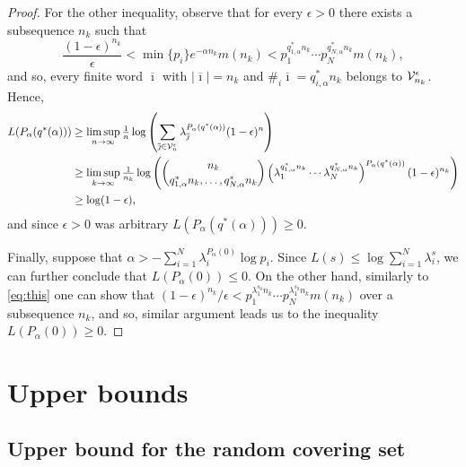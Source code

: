\documentclass[12pt,]{article}
\theoremstyle{definition}
\theoremstyle{remark}
\newcommand{\cV}{{\cal V}}
\newcommand{\0}{\mathbf{0}}
\newcommand{\bi}{{\overline {\imath}}}
\newcommand{\bj}{{\overline  {\jmath}}}
\begin{document}
\begin{proof}
  For the other inequality, observe that for every $\epsilon>0$ there exists a subsequence $n_k$ such that
  \begin{equation}\label{eq:this}
    \frac{(1-\epsilon)^{n_k}}{\epsilon}<\min\{p_i\}e^{-\alpha n_k}m(n_k)<p_1^{q_{1,\alpha}^*n_k}\cdots p_N^{q_{N,\alpha}^*n_k}m(n_k),
  \end{equation}
  and so, every finite word $\bi$ with $|\bi|=n_k$ and $\#_i\bi=q_{i,\alpha}^*n_k$ belongs to
  $\cV_{n_k}^\epsilon$. Hence,
  \[
    \begin{split}
      L(P_\alpha(q^*(\alpha)))&\geq\limsup_{n\to \infty} \tfrac 1n \log\left( \sum_{\bj\in \cV_n^\epsilon}\lambda_{\bj}^{P_\alpha(q^*(\alpha))}(1-\epsilon)^n\right)\\
			      &\geq\limsup_{k\to \infty} \tfrac{1}{n_k} \log\left( \binom{n_k}{q_{1,\alpha}^*n_k,\ldots,q_{N,\alpha}^*n_k}\left(\lambda_{1}^{q_{1,\alpha}^*n_k}\cdots\lambda_{N}^{q_{N,\alpha}^*n_k}\right)^{P_\alpha(q^*(\alpha))}(1-\epsilon)^{n_k}\right)\\
			      &\geq\log(1-\epsilon),
    \end{split}
  \]
  and since $\epsilon>0$ was arbitrary $L(P_\alpha(q^*(\alpha)))\geq0$.

  Finally, suppose that $\alpha>-\sum_{i=1}^N\lambda_i^{P_\alpha(0)}\log p_i$. Since
  $L(s)\leq\log\sum_{i=1}^N\lambda_i^s$, we can further conclude that 
  $L(P_\alpha(0))\leq0$. On the other hand, similarly to \cref{eq:this} one can show that
  $(1-\epsilon)^{n_k}/\epsilon<p_1^{\lambda_1^{s_0}n_k}\cdots p_N^{\lambda_1^{s_0}n_k}m(n_k)$ over a
  subsequence $n_k$, and so, similar argument leads us to the inequality $L(P_\alpha(0))\geq0$.
\end{proof}

\section{Upper bounds}\label{sec:upper}

\subsection{Upper bound for the random covering set}
\end{document}
